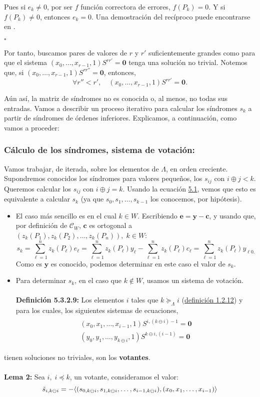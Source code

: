 \documentclass[11pt,spanish]{book}
\newcommand{\qed}{\begin{flushright} $\square$ \end{flushright}}
\begin{document}
Pues si $e_k\neq 0$, por ser $f$ función correctora de errores, $f(P_k)=0$. Y si $f(P_k)\neq 0$, entonces $e_{k}=0$. Una demostración del recíproco puede encontrarse en \cite{Bras-Amorós3}.
\qed

Por tanto, buscamos pares de valores de $r$ y $r'$ suficientemente grandes como para que el sistema $(x_0,\ldots,x_{r-1},1)S^{rr'}=\mathbf{0}$ tenga una solución no trivial. Notemos que, si $(x_0,\ldots,x_{r-1},1)S^{rr''}=\mathbf{0}$, entonces,
$$\forall r''<r',\quad(x_0,\ldots,x_{r-1},1)S^{rr'}=\mathbf{0}.$$

Aún así, la matriz de síndromes no es conocida o, al menos, no todas sus entradas. Vamos a describir un proceso iterativo para calcular los síndromes $s_k$ a partir de síndromes de órdenes inferiores. Explicamos, a continuación, como vamos a proceder:
\subsubsection{Cálculo de los síndromes, sistema de votación:}
Vamos trabajar, de iterada, sobre los elementos de $\Lambda$, en orden creciente. Supondremos conocidos los síndromes para valores pequeños, los $s_{ij}$ con $i\oplus j < k$. Queremos calcular los $s_{ij}$ con $i\oplus j = k$. Usando la ecuación \hyperlink{eq5.1}{5.1}, vemos que esto es equivalente a calcular $s_k$ (ya que $s_0,s_1,\ldots,s_{k-1}$ los conocemos, por hipótesis). 
\begin{itemize}
 \item El caso más sencillo es en el cual $k\in W$. Escribiendo $\mathbf{e}=\mathbf{y}-\mathbf{c}$, y usando que, por definición de $\mathcal{C}_W$, $\mathbf{c}$ es ortogonal a $(z_{k}(P_1),z_{k}(P_2),\ldots,z_{k}(P_n)),\;k\in W$:
$$s_{k}=\sum_{\ell = 1}^{n}z_{k}(P_{\ell})e_{\ell} = \sum_{\ell = 1}^{n}z_{k}(P_{\ell})y_{\ell}-\sum_{\ell = 1}^{n}z_{k}(P_{\ell})c_{\ell}=\sum_{\ell = 1}^{n}z_{k}(P_{\ell})y_{\ell0.}$$
Como es $\mathbf{y}$ es conocido, podemos determinar en este caso el valor de $s_k$. 
 \item Para determinar $s_k$, en el caso que $k\notin W$, usamos un sistema de votación.\\
 \\ \textbf{Definición 5.3.2.9:}   Los elementos $i$ tales que $k\succeq_{\Lambda} i$ (\hyperlink{def5.2.5}{definición 1.2.12}) y para los cuales, los siguientes sistemas de ecuaciones,
 \begin{align}
 \begin{split}
 (x_0,x_1,\ldots,x_{i-1},1)S^{i,(k\ominus i)-1}=\mathbf{0}\\
 (y_0,y_1,\ldots,y_{k\ominus i},1)S^{k\ominus i, (i-1)}=\mathbf{0}
 \end{split}
 \end{align}
 \end{itemize}
 \hspace{10mm}tienen soluciones no triviales, son los \textbf{votantes}.\\
 \\\hypertarget{lema5.2}{\textbf{Lema 2: }} Sea $i,\; i\preccurlyeq k$, un votante, consideramos el valor:
 $$\Tilde{s}_{i,k\ominus i}=-\langle (s_{0,k\ominus i},s_{1,k\ominus i},\ldots, s_{i-1,k\ominus i} ),(x_0,x_1,\ldots, x_{i-1})\rangle$$
\end{document}
